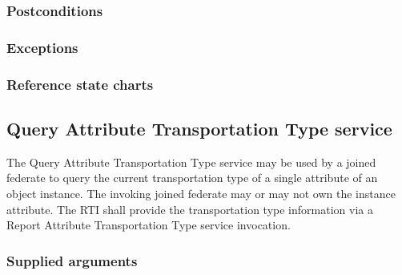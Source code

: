\begin{compactstdpage}
    \subsubsection{Postconditions}



    \subsubsection{Exceptions}



    \subsubsection{Reference state charts}



    \subsection{Query Attribute Transportation Type service}


    The Query Attribute Transportation Type service may be used by a joined federate to query the current transportation type of a single attribute of an object instance. The invoking joined federate may or may not own the instance attribute. The RTI shall provide the transportation type information via a Report Attribute Transportation Type \rtiinitiated{} service invocation.

    \subsubsection{Supplied arguments}



\end{compactstdpage}

\clearpage

